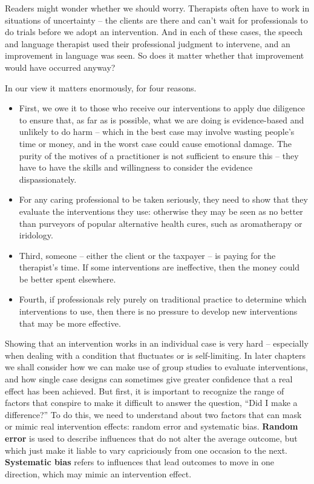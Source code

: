 \documentclass{krantz}
\providecommand{\tightlist}{%
\setlength{\itemsep}{0pt}\setlength{\parskip}{0pt}}
\begin{document}
Readers might wonder whether we should worry. Therapists often have to work in situations of uncertainty -- the clients are there and can't wait for professionals to do trials before we adopt an intervention. And in each of these cases, the speech and language therapist used their professional judgment to intervene, and an improvement in language was seen. So does it matter whether that improvement would have occurred anyway?

In our view it matters enormously, for four reasons.

\begin{itemize}
\tightlist
\item
  First, we owe it to those who receive our interventions to apply due diligence to ensure that, as far as is possible, what we are doing is evidence-based and unlikely to do harm -- which in the best case may involve wasting people's time or money, and in the worst case could cause emotional damage. The purity of the motives of a practitioner is not sufficient to ensure this -- they have to have the skills and willingness to consider the evidence dispassionately.
\item
  For any caring professional to be taken seriously, they need to show that they evaluate the interventions they use: otherwise they may be seen as no better than purveyors of popular alternative health cures, such as aromatherapy or iridology.
\item
  Third, someone -- either the client or the taxpayer -- is paying for the therapist's time. If some interventions are ineffective, then the money could be better spent elsewhere.
\item
  Fourth, if professionals rely purely on traditional practice to determine which interventions to use, then there is no pressure to develop new interventions that may be more effective.
\end{itemize}

Showing that an intervention works in an individual case is very hard -- especially when dealing with a condition that fluctuates or is self-limiting. In later chapters we shall consider how we can make use of group studies to evaluate interventions, and how single case designs can sometimes give greater confidence that a real effect has been achieved. But first, it is important to recognize the range of factors that conspire to make it difficult to answer the question, ``Did I make a difference?'' To do this, we need to understand about two factors that can mask or mimic real intervention effects: random error and systematic bias. \textbf{Random error} is used to describe influences that do not alter the average outcome, but which just make it liable to vary capriciously from one occasion to the next. \textbf{Systematic bias} refers to influences that lead outcomes to move in one direction, which may mimic an intervention effect.
\end{document}

